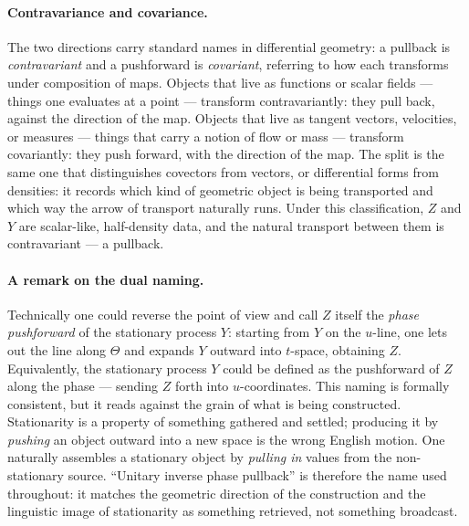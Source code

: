 \documentclass[11pt]{article}
\begin{document}
\paragraph{Contravariance and covariance.}
The two directions carry standard names in differential geometry: a pullback is \emph{contravariant} and a pushforward is \emph{covariant}, referring to how each transforms under composition of maps. Objects that live as functions or scalar fields --- things one evaluates at a point --- transform contravariantly: they pull back, against the direction of the map. Objects that live as tangent vectors, velocities, or measures --- things that carry a notion of flow or mass --- transform covariantly: they push forward, with the direction of the map. The split is the same one that distinguishes covectors from vectors, or differential forms from densities: it records which kind of geometric object is being transported and which way the arrow of transport naturally runs. Under this classification, $Z$ and $Y$ are scalar-like, half-density data, and the natural transport between them is contravariant --- a pullback.

\paragraph{A remark on the dual naming.}
Technically one could reverse the point of view and call $Z$ itself the \emph{phase pushforward} of the stationary process $Y$: starting from $Y$ on the $u$-line, one lets out the line along $\Theta$ and expands $Y$ outward into $t$-space, obtaining $Z$. Equivalently, the stationary process $Y$ could be defined as the pushforward of $Z$ along the phase --- sending $Z$ forth into $u$-coordinates. This naming is formally consistent, but it reads against the grain of what is being constructed. Stationarity is a property of something gathered and settled; producing it by \emph{pushing} an object outward into a new space is the wrong English motion. One naturally assembles a stationary object by \emph{pulling in} values from the non-stationary source. ``Unitary inverse phase pullback'' is therefore the name used throughout: it matches the geometric direction of the construction and the linguistic image of stationarity as something retrieved, not something broadcast.
\end{document}

